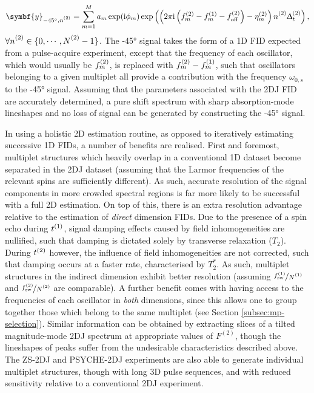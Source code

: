 \begin{equation}
    \symbf{y}_{\ang{-45},\ntwo} =
        \sum_{m=1}^{M} a_m \exp (\iu \phi_m)
        \exp\left(\left(2 \pi \iu \left(\ftwo_m - \fone_m - \fofftwo\right)
                - \etatwo_m
            \right) \ntwo \Dttwo
        \right),
    \label{eq:neg-45}
\end{equation}
$\forall \ntwo \in \lbrace 0, \cdots, \Ntwo - 1 \rbrace$. The \ang{-45} signal
takes the form of a \ac{1D} \ac{FID} expected from a pulse-acquire experiment,
except that the frequency of each oscillator, which would usually be $f^{(2)}_m$,
is replaced with $f^{(2)}_m - f^{(1)}_m$, such that oscillators belonging to a
given multiplet all provide a contribution with the frequency $\omega_{0,s}$ to
the \ang{-45} signal. Assuming that the parameters associated with the \ac{2DJ}
\ac{FID} are accurately determined, a pure shift spectrum with sharp
absorption-mode lineshapes and no loss of signal can be generated by
constructing the \ang{-45} signal.

In using a holistic \ac{2D} estimation routine, as opposed to iteratively
estimating successive \ac{1D} \acp{FID}, a number of benefits are realised.
First and foremost, multiplet structures which heavily overlap in a
conventional \ac{1D} dataset become separated in the \ac{2DJ} dataset (assuming
that the Larmor frequencies of the relevant spins are sufficiently different).
As such, accurate resolution of the signal components in more crowded spectral
regions is far more likely to be successful with a full \ac{2D} estimation.
On top of this, there is an extra resolution advantage relative to the
estimation of \emph{direct} dimension \acp{FID}. Due to the presence of a spin
echo during $t^{(1)}$, signal damping effects caused by field inhomogeneities are
nullified, such that damping is dictated solely by transverse relaxation
($T_2$). During $t^{(2)}$ however, the influence of field inhomogeneities are not
corrected, such that damping occurs at a faster rate, characterised by $T_2^*$.
As such, multiplet structures in the indirect dimension exhibit better
resolution (assuming $\nicefrac{\fswone}{\None}$ and
$\nicefrac{\fswtwo}{\Ntwo}$ are comparable).
A further benefit comes with having access to the frequencies of each
oscillator in \emph{both} dimensions, since this allows one to group together
those which belong to the same multiplet (see Section
\ref{subsec:mp-selection}). Similar information can be obtained
by extracting slices of a tilted magnitude-mode \ac{2DJ} spectrum at
appropriate values of $F^{(2)}$, though the lineshapes of peaks suffer from the
undesirable characteristics described above. The
\ac{ZS}-\ac{2DJ}\cite{Pell2007} and
\ac{PSYCHE}-\ac{2DJ}\cite{Foroozandeh2015,Kiraly2017} experiments are also able
to generate individual multiplet structures, though with long \ac{3D} pulse
sequences, and with reduced sensitivity relative to a conventional \ac{2DJ}
experiment.

